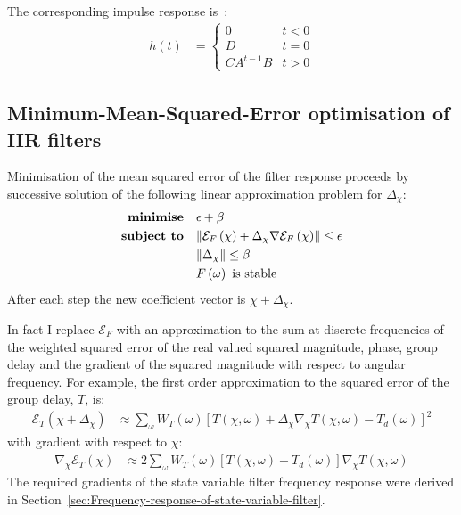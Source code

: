 \documentclass[a4paper,twoside,10pt,english]{article}
\DeclarePairedDelimiter{\mathnorm}{\lVert}{\rVert}
\begin{document}
The corresponding impulse response
is~\cite[Equation 8.3.21]{RobertsMullis_DigitalSignalProcessing}:
\begin{align*}
h\left(t\right) &= \begin{cases}
0 & t<0\\
D & t=0\\
CA^{t-1}B & t>0
\end{cases}
\end{align*}

\subsection{Minimum-Mean-Squared-Error optimisation of IIR filters}
Minimisation of the mean squared error of the filter response proceeds by
successive solution of the following linear approximation problem
for $\Delta_{\chi}$:
\begin{align}
\begin{split}
  \textbf{minimise}\quad & \epsilon+\beta \\
  \textbf{subject to}\quad & \mathnorm{\mathcal{E}_{F}\left(\chi\right) +
          \Delta_{\chi}\nabla\mathcal{E}_{F}\left(\chi\right)}\le\epsilon \\
  & \mathnorm{\Delta_{\chi}}\le\beta \\
  & F\left(\omega\right)\text{ is stable}
\end{split}
\label{eqn:Optimisation-of-minimum-mean-squared-response-error}
\end{align}
After each step the new coefficient vector is $\chi+\Delta_{\chi}$. 

In fact I replace $\mathcal{E}_{F}$ with an approximation to the sum at discrete
frequencies of the weighted squared error of the real valued squared magnitude,
phase, group delay and the gradient of the squared magnitude with respect to
angular frequency. For example, the first order approximation to the squared
error of the group delay, $T$, is:
\begin{align*}
  \bar{\mathcal{E}}_{T}\left(\chi+\Delta_{\chi}\right)
  &\approx \sum_{\omega} W_{T}\left(\omega\right)
     \left[T\left(\chi,\omega\right) + \right.
    \left. \Delta_{\chi}\nabla_{\chi}T\left(\chi,\omega\right) - \right.
    \left. T_{d}\left(\omega\right)\right]^{2}
\end{align*}
with gradient with respect to $\chi$:
\begin{align*}
  \nabla_{\chi} \bar{\mathcal{E}}_{T}\left(\chi\right)
  &\approx 2 \sum_{\omega} W_{T}\left(\omega\right)
    \left[T\left(\chi,\omega\right)-T_{d}\left(\omega\right)\right]
    \nabla_{\chi}T\left(\chi,\omega\right)
\end{align*}
The required gradients of the state variable filter frequency response were
derived in Section~\ref{sec:Frequency-response-of-state-variable-filter}.
\end{document}
